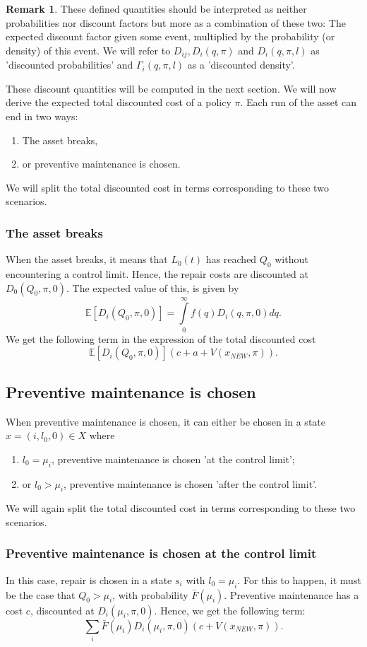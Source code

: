 \documentclass[a4paper]{thesis}
\theoremstyle{definition}
\newtheorem{remark}{Remark}[chapter]
\begin{document}
\begin{remark}
	These defined quantities should be interpreted as neither probabilities nor discount factors but more as a combination of these two: The expected discount factor given some event, multiplied by the probability (or density) of this event.
	We will refer to $D_{ij},D_{i}(q,\pi)$ and $D_{i}(q,\pi,l)$ as 'discounted probabilities' and $\Gamma_i(q,\pi,l)$ as a 'discounted density'.
\end{remark}
These discount quantities will be computed in the next section.
We will now derive the expected total discounted cost of a policy $\pi$.
Each run of the asset can end in two ways:
\begin{enumerate}
	\item The asset breaks,
	\item or preventive maintenance is chosen.
\end{enumerate}
We will split the total discounted cost in terms corresponding to these two scenarios.

\subsubsection{The asset breaks}
When the asset breaks, it means that $L_0(t)$ has reached $Q_0$ without encountering a control limit.
Hence, the repair costs are discounted at $D_0(Q_0,\pi,0)$.
The expected value of this, is given by
\[
\mathbb{E}[D_{i}(Q_0,\pi,0)]=\int\limits_0^\infty f(q)D_{i}(q,\pi,0)dq.
\]
We get the following term in the expression of the total discounted cost
\[
\mathbb{E}[D_{i}(Q_0,\pi,0)](c+a+V(x_{NEW},\pi)).
\]

\subsection{Preventive maintenance is chosen}
When preventive maintenance is chosen, it can either be chosen in a state $x=(i,l_0,0)\in X$ where
\begin{enumerate}
	\item $l_0=\mu_i$, preventive maintenance is chosen 'at the control limit';
	\item or $l_0>\mu_i$, preventive maintenance is chosen 'after the control limit'.
\end{enumerate}
We will again split the total discounted cost in terms corresponding to these two scenarios.

\subsubsection{Preventive maintenance is chosen at the control limit}
In this case, repair is chosen in a state $s_i$ with $l_0=\mu_i$.
For this to happen, it must be the case that $Q_0>\mu_i$, with probability $\bar{F}(\mu_i)$.
Preventive maintenance has a cost $c$, discounted at $D_{i}(\mu_i,\pi,0)$.
Hence, we get the following term:
\[
\sum\limits_i\bar{F}(\mu_i)D_{i}(\mu_i,\pi,0)(c+V(x_{NEW},\pi)).
\]
\end{document}
